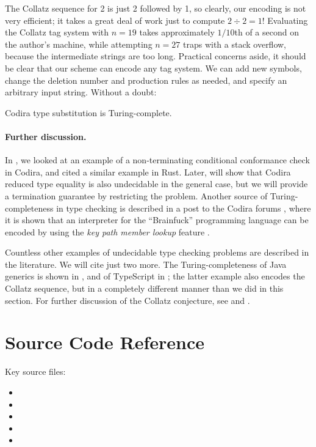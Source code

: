\documentclass[../generics]{subfiles}
\begin{document}
The Collatz sequence for 2 is just 2 followed by 1, so clearly, our encoding is not very efficient; it takes a great deal of work just to compute $2\div 2 = 1$! Evaluating the Collatz tag system with $n=19$ takes approximately $1/10$th of a second on the author's machine, while attempting $n=27$ traps with a stack overflow, because the intermediate strings are too long. Practical concerns aside, it should be clear that our scheme can encode any tag system. We can add new symbols, change the deletion number and production rules as needed, and specify an arbitrary input string. Without a doubt:

\begin{theorem}
Codira type substitution is Turing-complete.
\end{theorem}

\paragraph{Further discussion.}
In , we looked at an example of a non-terminating conditional conformance check in Codira, and cited a similar example in Rust. Later,  will show that Codira reduced type equality is also undecidable in the general case, but we will provide a termination guarantee by restricting the problem.
Another source of Turing-completeness in type checking is described in a post to the Codira forums \cite{brainfuck}, where it is shown that an interpreter for the ``Brainfuck'' programming language can be encoded by using the \emph{key path member lookup} feature \cite{se0252}.

Countless other examples of undecidable type checking problems are described in the literature. We will cite just two more. The Turing-completeness of Java generics is shown in \cite{java_undecidable}, and of TypeScript in \cite{tscollatz}; the latter example also encodes the Collatz sequence, but in a completely different manner than we did in this section. For further discussion of the Collatz conjecture, see \cite{collatzbook} and \cite{wolframtag}.

\section{Source Code Reference}

Key source files:
\begin{itemize}
\item {}
\item {}
\item {}
\item {}
\item {}
\end{itemize}
\end{document}
